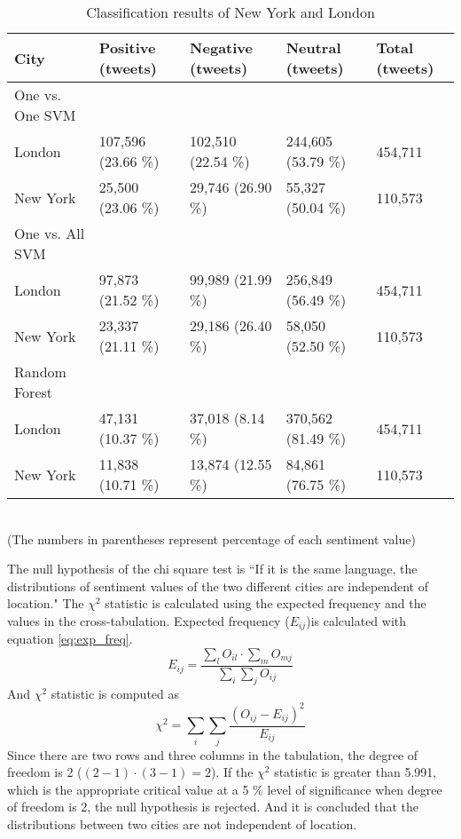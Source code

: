 \begin{table}[ht]
	\caption{Classification results of New York and London}
	\begin{tabular}{|l|p{1.8cm}|p{1.8cm}|p{1.8cm}|p{1.8cm}|} \hline
	City&Positive (tweets)&Negative (tweets)&Neutral (tweets)&Total (tweets)\\ \hline
	One vs. One SVM & {} & {} & {} & {}\\ \hline
London & 107,596 (23.66 \%) & 102,510 (22.54 \%) & 244,605 (53.79 \%)& 454,711 \\ \hline
New York & 25,500 (23.06 \%) & 29,746 (26.90 \%)& 55,327 (50.04 \%)& 110,573 \\ \hline
	One vs. All SVM & {} & {} & {} & {}\\ \hline

London & 97,873 (21.52 \%) & 99,989 (21.99 \%) & 256,849 (56.49 \%)& 454,711 \\ \hline

New York & 23,337 (21.11 \%)& 29,186 (26.40 \%)& 58,050 (52.50 \%)& 110,573 \\ \hline
	Random Forest & {} & {} & {} & {}\\ \hline

London & 47,131 (10.37 \%)  & 37,018 (8.14 \%)  & 370,562 (81.49 \%) & 454,711 \\ \hline

New York  & 11,838 (10.71 \%)& 13,874 (12.55 \%)& 84,861 (76.75 \%)& 110,573 \\ \hline
	\end{tabular}
	\label{tab:result_london_ny}
	\\(The numbers in parentheses represent percentage of each sentiment value)
\end{table}

The null hypothesis of the chi square test is ``If it is the same language, the distributions of sentiment values of the two different cities are independent of location."
The $\chi^2$ statistic is calculated using the expected frequency and the values in the cross-tabulation.
Expected frequency ($E_{ij}$)is calculated with equation \ref{eq:exp_freq}.
\begin{equation}
E_{ij} = \frac{\sum_{l} O_{il} \cdot \sum_{m} O_{mj}}{\sum_{i} \sum_{j} O_{ij}}
\label{eq:exp_freq}
\end{equation}
And $\chi^2$ statistic is computed as 
\begin{equation}
\chi^2 = \sum_{i} \sum_{j} \frac{(O_{ij} - E_{ij})^2}{E_{ij}}
\end{equation}
Since there are two rows and three columns in the tabulation, the degree of freedom is 2 ($(2 - 1 ) \cdot  (3 - 1) = 2$).
If the $\chi^2$ statistic is greater than 5.991, which is the appropriate critical value at a 5 \% level of significance when degree of freedom is 2, the null hypothesis is rejected.
And it is concluded that the distributions between two cities are not independent of location. 

